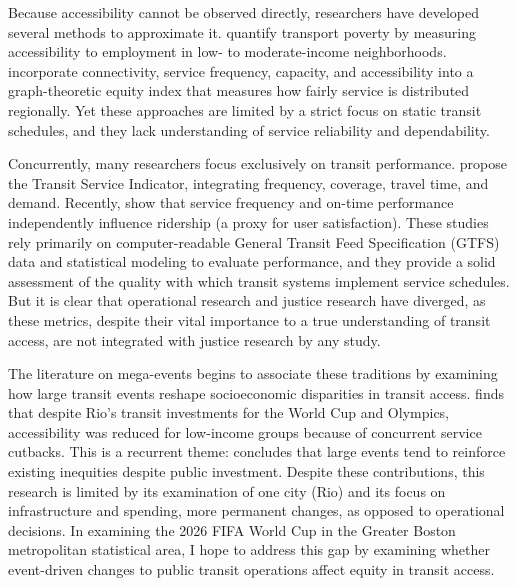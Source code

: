\documentclass[12pt]{article}
\begin{document}
Because accessibility cannot be observed directly, researchers have developed several methods to approximate it.
\citet{allenSizingTransportPoverty2019} quantify transport poverty by measuring accessibility to employment in low- to moderate-income neighborhoods.
\citet{welchMeasureEquityPublic2013} incorporate connectivity, service frequency, capacity, and accessibility into a graph-theoretic equity index that measures how fairly service is distributed regionally.
Yet these approaches are limited by a strict focus on static transit schedules, and they lack understanding of service reliability and dependability.

Concurrently, many researchers focus exclusively on transit performance. \citet{fuNewPerformanceIndex2007} propose the Transit Service Indicator, integrating frequency, coverage, travel time, and demand.
Recently, \citet{lyuAnalyzingImpactService2026} show that service frequency and on-time performance independently influence ridership (a proxy for user satisfaction).
These studies rely primarily on computer-readable General Transit Feed Specification (GTFS) data and statistical modeling to evaluate performance, and they provide a solid assessment of the quality with which transit systems implement service schedules.
But it is clear that operational research and justice research have diverged, as these metrics, despite their vital importance to a true understanding of transit access, are not integrated with justice research by any study.

The literature on mega-events begins to associate these traditions by examining how large transit events reshape socioeconomic disparities in transit access.
\citet{pereiraTransportLegacyMegaevents2018} finds that despite Rio's transit investments for the World Cup and Olympics, accessibility was reduced for low-income groups because of concurrent service cutbacks.
This is a recurrent theme: \citet{pereiraTransportLegacyMegaevents2020} concludes that large events tend to reinforce existing inequities despite public investment.
Despite these contributions, this research is limited by its examination of one city (Rio) and its focus on infrastructure and spending, more permanent changes, as opposed to operational decisions.
In examining the 2026 FIFA World Cup in the Greater Boston metropolitan statistical area, I hope to address this gap by examining whether event-driven changes to public transit operations affect equity in transit access.
\end{document}
